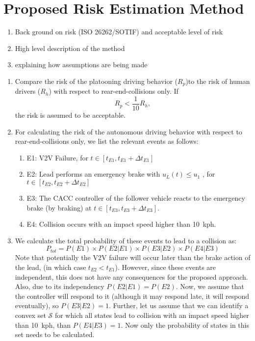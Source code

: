 \section{Proposed Risk Estimation Method} %
\label{sec:method}


\begin{enumerate}
	\item Back ground on risk (ISO 26262/SOTIF) and acceptable level of risk
	\item High level description of the method 
	\item explaining how assumptions are being made
\end{enumerate}


\begin{enumerate}
\item{Compare the risk of the platooning driving behavior ($R_p$)to the risk of human drivers ($R_h$) with respect to rear-end-collisions only. If $$R_p < \frac{1}{10} R_h, $$ the risk is assumed to be acceptable.}
\item{For calculating the risk of the autonomous driving behavior with respect to rear-end-collisions only, we list the relevant events as follows:
\begin{enumerate}
\item{E1: V2V Failure, for $t\in[t_{E1}, t_{E1}+\Delta t_{E1}]$}
\item{E2: Lead performs an emergency brake with $u_{L}(t)\leq u_1$ , for $t\in[t_{E2}, t_{E2}+\Delta t_{E2}]$}
\item{E3: The CACC controller of the follower vehicle reacts to the emergency brake (by braking) at $t\in[t_{E3}, t_{E3}+\Delta t_{E3}]$.}
\item{E4: Collision occurs with an impact speed higher than 10~kph.}
\end{enumerate}
}
\item{We calculate the total probability of these events to lead to a collision as:
\begin{equation}
P_{tot} = P(E1) \times P(E2|E1) \times P(E3|E2) \times P(E4|E3)
\end{equation}
Note that potentially the V2V failure will occur later than the brake action of the lead, (in which case $t_{E2}<t_{E1}$). However, since these events are independent, this does not have any consequences for the proposed approach. Also, due to its independency $ P(E2|E1)=P(E2)$.
Now, we assume that the controller will respond to it (although it may respond late, it will respond eventually), so $P(E3|E2)=1$. Further, let us assume that we can identify a convex set $\mathcal{S}$ for which all states lead to collision with an impact speed higher than 10~kph, than $P(E4|E3)=1$.  Now only the probability of states in this set needs to be calculated.
}
\end{enumerate}
